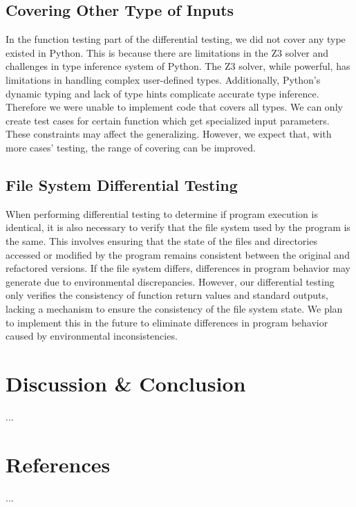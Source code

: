 \documentclass[11pt]{article}
\begin{document}
\subsection{Covering Other Type of Inputs}
In the function testing part of the differential testing, we did not cover any type existed in Python. This is because there are limitations in the Z3 solver and challenges in type inference system of Python. The Z3 solver, while powerful, has limitations in handling complex user-defined types. Additionally, Python's dynamic typing and lack of type hints complicate accurate type inference. Therefore we were unable to implement code that covers all types. We can only create test cases for certain function which get specialized input parameters. These constraints may affect the generalizing. However, we expect that, with more cases' testing, the range of covering can be improved. \\

\subsection{File System Differential Testing}
When performing differential testing to determine if program execution is identical, it is also necessary to verify that the file system used by the program is the same. This involves ensuring that the state of the files and directories accessed or modified by the program remains consistent between the original and refactored versions. If the file system differs, differences in program behavior may generate due to environmental discrepancies. However, our differential testing only verifies the consistency of function return values and standard outputs, lacking a mechanism to ensure the consistency of the file system state. We plan to implement this in the future to eliminate differences in program behavior caused by environmental inconsistencies.

\section{Discussion \& Conclusion}
...\\

\section{References}
...\\
\end{document}
